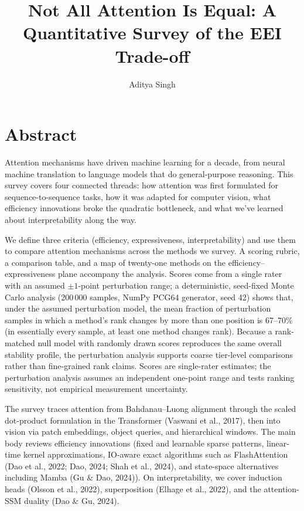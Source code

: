 \documentclass[10pt,twocolumn]{article}
\title{Not All Attention Is Equal: A Quantitative Survey of the EEI Trade-off}
\author{Aditya Singh}
\date{}
\begin{document}
\maketitle

\section*{Abstract}

Attention mechanisms have driven machine learning for a decade, from neural machine translation to language models that do general-purpose reasoning. This survey covers four connected threads: how attention was first formulated for sequence-to-sequence tasks, how it was adapted for computer vision, what efficiency innovations broke the quadratic bottleneck, and what we've learned about interpretability along the way.

We define three criteria (efficiency, expressiveness, interpretability) and use them to compare attention mechanisms across the methods we survey. A scoring rubric, a comparison table, and a map of twenty-one methods on the efficiency--expressiveness plane accompany the analysis. Scores come from a single rater with an assumed $\pm 1$-point perturbation range; a deterministic, seed-fixed Monte Carlo analysis (200\,000 samples, NumPy PCG64 generator, seed 42) shows that, under the assumed perturbation model, the mean fraction of perturbation samples in which a method's rank changes by more than one position is 67--70\% (in essentially every sample, at least one method changes rank). Because a rank-matched null model with randomly drawn scores reproduces the same overall stability profile, the perturbation analysis supports coarse tier-level comparisons rather than fine-grained rank claims. Scores are single-rater estimates; the perturbation analysis assumes an independent one-point range and tests ranking sensitivity, not empirical measurement uncertainty.

The survey traces attention from Bahdanau--Luong alignment through the scaled dot-product formulation in the Transformer (Vaswani et al., 2017), then into vision via patch embeddings, object queries, and hierarchical windows. The main body reviews efficiency innovations (fixed and learnable sparse patterns, linear-time kernel approximations, IO-aware exact algorithms such as FlashAttention (Dao et al., 2022; Dao, 2024; Shah et al., 2024), and state-space alternatives including Mamba (Gu \& Dao, 2024)). On interpretability, we cover induction heads (Olsson et al., 2022), superposition (Elhage et al., 2022), and the attention-SSM duality (Dao \& Gu, 2024).
\end{document}
